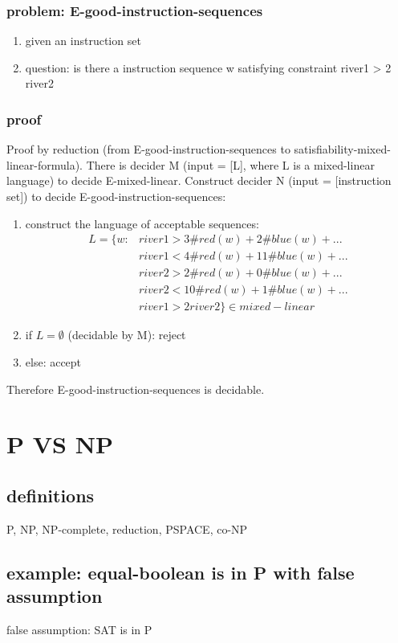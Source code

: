 \documentclass{article}
\begin{document}
\subsubsection{problem: E-good-instruction-sequences}
\begin{enumerate}
	\item given an instruction set
	\item question: is there a instruction sequence w satisfying constraint 
	river1 > 2 river2
\end{enumerate}

\subsubsection{proof}
Proof by reduction (from E-good-instruction-sequences to 
satisfiability-mixed-linear-formula).
There is decider M (input = [L], where L is a mixed-linear language) to decide 
E-mixed-linear.
Construct decider N (input = [instruction set]) to decide 
E-good-instruction-sequences:
\begin{enumerate}
	\item construct the language of acceptable sequences:
	\begin{align*}
	L = \{w: & river1 > 3\#red(w) + 2\#blue(w) + ... \\
	& river1 < 4\#red(w) + 11\#blue(w) + ... \\
	& river2 > 2\#red(w) + 0\#blue(w) + ... \\
	& river2 < 10\#red(w) + 1\#blue(w) + ... \\
	& river1 > 2river2\} \in mixed-linear
	\end{align*}
	\item if $ L = \emptyset $ (decidable by M): reject
	\item else: accept
\end{enumerate}
Therefore E-good-instruction-sequences is decidable.

\section{P VS NP}
\subsection{definitions}
P, NP, NP-complete, reduction, PSPACE, co-NP

\subsection{example: equal-boolean is in P with false assumption}
false assumption: SAT is in P
\end{document}

